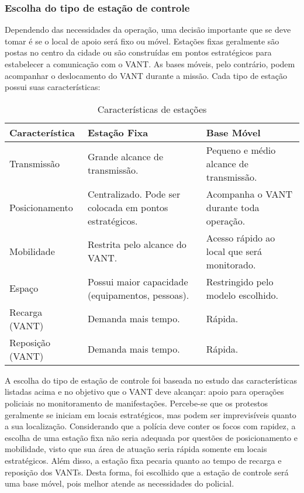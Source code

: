 \subsubsection{Escolha do tipo de estação de controle}

Dependendo das necessidades da operação, uma decisão importante que se deve tomar é se o local de apoio será fixo ou móvel. Estações fixas geralmente são postas no centro da cidade ou são construídas em pontos estratégicos para estabelecer a comunicação com o VANT. As bases móveis, pelo contrário, podem acompanhar o deslocamento do VANT durante a missão. Cada tipo de estação possui suas características:

\begin{table}[H]
\centering
\begin{tabular}{|l|p{4cm}|p{4cm}|}
\hline
\textbf{Característica} & \textbf{Estação Fixa} & \textbf{Base Móvel} \\ \hline
Transmissão & Grande alcance de transmissão. & Pequeno e médio alcance de transmissão. \\ \hline
Posicionamento & Centralizado. Pode ser colocada em pontos estratégicos. & Acompanha o VANT durante toda operação. \\ \hline
Mobilidade & Restrita pelo alcance do VANT. & Acesso rápido ao local que será monitorado. \\ \hline
Espaço & Possui maior capacidade (equipamentos, pessoas). & Restringido pelo modelo escolhido. \\ \hline
Recarga (VANT) & Demanda mais tempo. & Rápida. \\ \hline
Reposição (VANT) & Demanda mais tempo. & Rápida. \\ \hline
\end{tabular}
\caption{Características de estações}
\label{carac-estac}
\end{table}

A escolha do tipo de estação de controle foi baseada no estudo das características listadas acima e no objetivo que o VANT deve alcançar: apoio para operações policiais no monitoramento de manifestações. Percebe-se que os protestos geralmente se iniciam em locais estratégicos, mas podem ser imprevisíveis quanto a sua localização. Considerando que a polícia deve conter os focos com rapidez, a escolha de uma estação fixa não seria adequada por questões de posicionamento e mobilidade, visto que sua área de atuação seria rápida somente em locais estratégicos. Além disso, a estação fixa pecaria quanto ao tempo de recarga e reposição dos VANTs. Desta forma, foi escolhido que a estação de controle será uma base móvel, pois melhor atende as necessidades do policial.

